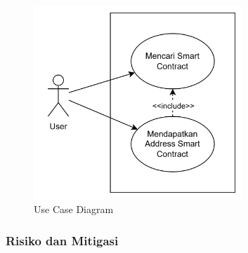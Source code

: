 \begin{figure}[ht]
	\centering
	\includegraphics[width=0.7\textwidth]{resources/chapter-3/use-case.png}
	\caption{Use Case Diagram}
	\label{image:usecase}
\end{figure}

\subsubsection{Risiko dan Mitigasi}
